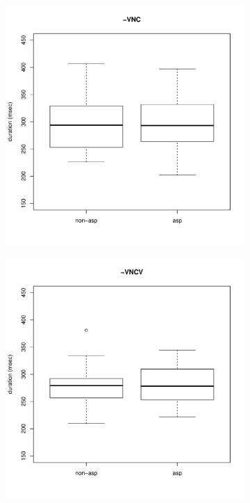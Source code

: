 \documentclass[11pt,a4paper,oneside,openany]{memoir}\usepackage[]{graphicx}\usepackage[]{color}
\newenvironment{knitrout}{}{} %
\begin{document}
\begin{figure}
\begin{subfigure}{.5\textwidth}
\begin{knitrout}
\end{knitrout}
\end{subfigure}
\begin{subfigure}{.5\textwidth}
\centering
\begin{knitrout}
\color{fgcolor}
\includegraphics[width=\textwidth]{img/mono-nas-vor-1} 

\end{knitrout}
\end{subfigure}
\begin{subfigure}{.5\textwidth}
\centering
\begin{knitrout}
\color{fgcolor}
\includegraphics[width=\textwidth]{img/di-nas-vor-1} 


\end{knitrout}
\end{subfigure}
\end{figure}
\end{document}
